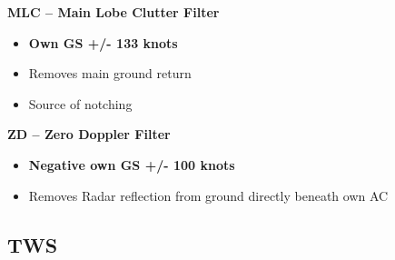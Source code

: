 \begin{tableitemize}
{\begin{subitemize}
        \item \textbf{MLC -- Main Lobe Clutter Filter}
        \begin{itemize}
            \item \textbf{Own GS +/- 133 knots}
            \item Removes main ground return
            \item Source of notching
        \end{itemize}
        \item \textbf{ZD -- Zero Doppler Filter}
        \begin{itemize}
            \item \textbf{Negative own GS +/- 100 knots}
            \item Removes Radar reflection from ground directly beneath own AC
        \end{itemize}
    \end{subitemize}}
\end{tableitemize}

\clearpage

\subsection{TWS}
\label{sec:awg9-tws}

